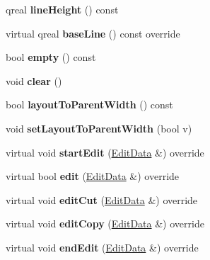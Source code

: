 \begin{DoxyCompactItemize}
qreal {\bfseries line\+Height} () const
\item 
\mbox{\label{class_ms_1_1_text_ad6e4bb6dd4ad17c2e973fb63d5faa72b}} 
virtual qreal {\bfseries base\+Line} () const override
\item 
\mbox{\label{class_ms_1_1_text_acc9d59775adbb8fb33ca7f7abdd92fae}} 
bool {\bfseries empty} () const
\item 
\mbox{\label{class_ms_1_1_text_a7b4bc0a8a21239141e8879a11343b561}} 
void {\bfseries clear} ()
\item 
\mbox{\label{class_ms_1_1_text_a520bdf1c9dd4d22950b3949416f47eae}} 
bool {\bfseries layout\+To\+Parent\+Width} () const
\item 
\mbox{\label{class_ms_1_1_text_a43e2bb22881301f777549ff1abb04cc5}} 
void {\bfseries set\+Layout\+To\+Parent\+Width} (bool v)
\item 
\mbox{\label{class_ms_1_1_text_aa39d54d3e63fa287e36500f850a7104a}} 
virtual void {\bfseries start\+Edit} (\hyperlink{class_ms_1_1_edit_data}{Edit\+Data} \&) override
\item 
\mbox{\label{class_ms_1_1_text_a20668c31fb60d561915e911d827964f1}} 
virtual bool {\bfseries edit} (\hyperlink{class_ms_1_1_edit_data}{Edit\+Data} \&) override
\item 
\mbox{\label{class_ms_1_1_text_af8e57919838e3ef9c7b984249275f9a0}} 
virtual void {\bfseries edit\+Cut} (\hyperlink{class_ms_1_1_edit_data}{Edit\+Data} \&) override
\item 
\mbox{\label{class_ms_1_1_text_a117d6f960cef1bbcf1a5a67bb265c03e}} 
virtual void {\bfseries edit\+Copy} (\hyperlink{class_ms_1_1_edit_data}{Edit\+Data} \&) override
\item 
\mbox{\label{class_ms_1_1_text_a4b7763f0699d896ac4e3745becdfed22}} 
virtual void {\bfseries end\+Edit} (\hyperlink{class_ms_1_1_edit_data}{Edit\+Data} \&) override
\item 
\mbox{\label{class_ms_1_1_text_a10f45f1b0695e04c373a35159239b3de}} 

\end{DoxyCompactItemize}
